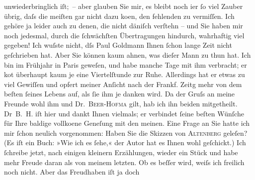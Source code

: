 \begin{ledgroupsized}[t]{13cm}
                    unwiederbringlich iſt; – aber glauben Sie mir, es bleibt noch i{\geminationm}er ſo viel Zauber übrig, daſs die meiſten gar
                    nicht dazu ko{\geminationm}en, den fehlenden zu vermiſſen. Ich
                    gehöre ja leider auch zu denen, die nicht däniſch verſtehn – und Sie haben mir noch jedesmal, durch die
                    ſchwächſten Übertragungen hindurch, wahrhaftig {\pb}viel gegeben!\pend
           \pstart
           Ich wuſste nicht, dſs Paul Goldmann Ihnen
                    ſchon lange Zeit nicht geſchrieben hat. Aber Sie können kaum ahnen, was dieſer
                    Mann zu thun hat. Ich bin im Frühjahr in Paris
                    geweſen, und habe manche Tage mit ihm verbracht; er ko{\geminationm}t überhaupt kaum je eine Viertelſtunde zur Ruhe.
                    Allerdings hat er etwas zu viel Gewiſſen und opfert meiner An{\pb}ſicht nach der Frankf. Zeitg mehr von dem beſten ſeines Lebens auf, als ſie ihm je
                    danken wird. Da der Gruſs an meine Freunde wohl ihm und Dr. \textsc{Beer-Hofma{\geminationn}} gilt, hab ich ihn beiden mitgetheilt. Dr \textsc{B. H.} iſt hier und dankt Ihnen vielmals; er
                    verbindet ſeine beſten Wünſche für Ihre baldige vollko{\geminationm}ene Geneſung mit den meinen.\pend
           \pstart
           {\pb}Eine Frage an Sie hatte ich mir ſchon
                    neulich vorgenommen: Haben Sie die Skizzen von \textsc{Altenberg} geleſen? (Es iſt ein Buch: »Wie ich es ſehe,« der Autor hat es Ihnen wohl
                    geſchickt.)\pend
           \pstart
           Ich ſchreibe jetzt, nach einigen kleinern Erzählungen, wieder ein Stück und habe
                    mehr Freude daran als von meinem letzten. Ob es beſſer wird,  weiſs ich freilich {\pb}noch nicht. Aber das Freudhaben iſt ja doch

\end{ledgroupsized}
